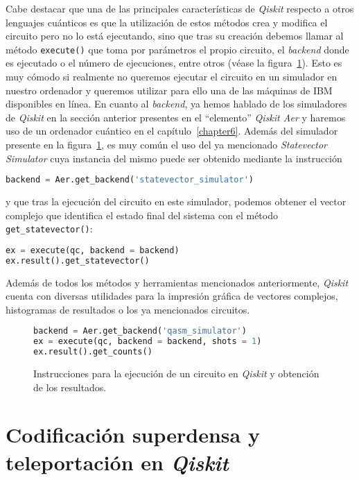 Cabe destacar que una de las principales características de \textit{Qiskit} respecto a otros lenguajes cuánticos es que la utilización de estos métodos crea y modifica el circuito pero no lo está ejecutando, sino que tras su creación debemos llamar al método \texttt{execute()} que toma por parámetros el propio circuito, el \textit{backend} donde es ejecutado o el número de ejecuciones, entre otros (véase la figura~\ref{fig:code52}). Esto es muy cómodo si realmente no queremos ejecutar el circuito en un simulador en nuestro ordenador y queremos utilizar para ello una de las máquinas de IBM disponibles en línea. En cuanto al \textit{backend}, ya hemos hablado de los simuladores de \textit{Qiskit} en la sección anterior presentes en el ``elemento'' \textit{Qiskit Aer} y haremos uso de un ordenador cuántico en el capítulo~\ref{chapter6}. Además del simulador presente en la figura~\ref{fig:code52}, es muy común el uso del ya mencionado \textit{Statevector Simulator} cuya instancia del mismo puede ser obtenido mediante la instrucción
\begin{lstlisting}[language=Python]
backend = Aer.get_backend('statevector_simulator')
\end{lstlisting}
y que tras la ejecución del circuito en este simulador, podemos obtener el vector complejo que identifica el estado final del sistema con el método \texttt{get\_statevector()}:
\begin{lstlisting}[language=Python]
ex = execute(qc, backend = backend)
ex.result().get_statevector()
\end{lstlisting}

Además de todos los métodos y herramientas mencionados anteriormente, \textit{Qiskit} cuenta con diversas utilidades para la impresión gráfica de vectores complejos, histogramas de resultados o los ya mencionados circuitos.

\begin{figure}[tb]
\begin{lstlisting}[language=Python]
backend = Aer.get_backend('qasm_simulator')
ex = execute(qc, backend = backend, shots = 1)
ex.result().get_counts()
\end{lstlisting}
\caption{Instrucciones para la ejecución de un circuito en \textit{Qiskit} y obtención de los resultados.}
\label{fig:code52}
\end{figure}

\section{Codificación superdensa y teleportación en \textit{Qiskit}}
\label{sec:sec52}


